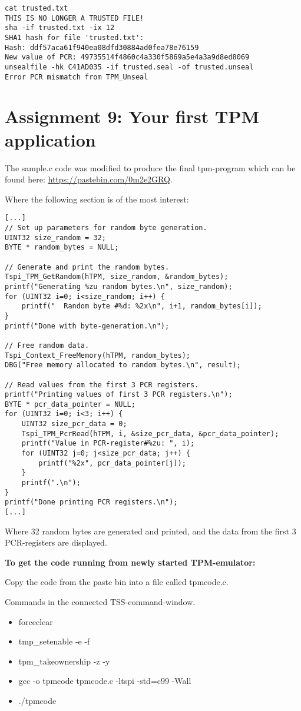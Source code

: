 \documentclass[10pt]{article}
\begin{document}
\begin{verbatim}
cat trusted.txt
THIS IS NO LONGER A TRUSTED FILE!
sha -if trusted.txt -ix 12
SHA1 hash for file 'trusted.txt':
Hash: ddf57aca61f940ea08dfd30884ad0fea78e76159
New value of PCR: 49735514f4860c4a330f5869a5e4a3a9d8ed8069
unsealfile -hk C41AD035 -if trusted.seal -of trusted.unseal
Error PCR mismatch from TPM_Unseal
\end{verbatim}

\section{Assignment 9: Your first TPM application}

The sample.c code was modified to produce the final tpm-program which can be
found here: \url{https://pastebin.com/0m2e2GRQ}.

Where the following section is of the most interest:

\begin{lstlisting}
[...]
// Set up parameters for random byte generation.
UINT32 size_random = 32;
BYTE * random_bytes = NULL;

// Generate and print the random bytes.
Tspi_TPM_GetRandom(hTPM, size_random, &random_bytes);
printf("Generating %zu random bytes.\n", size_random);
for (UINT32 i=0; i<size_random; i++) {
    printf("  Random byte #%d: %2x\n", i+1, random_bytes[i]);
}
printf("Done with byte-generation.\n");

// Free random data.
Tspi_Context_FreeMemory(hTPM, random_bytes);
DBG("Free memory allocated to random bytes.\n", result);

// Read values from the first 3 PCR registers.
printf("Printing values of first 3 PCR registers.\n");
BYTE * pcr_data_pointer = NULL;
for (UINT32 i=0; i<3; i++) {
    UINT32 size_pcr_data = 0;
    Tspi_TPM_PcrRead(hTPM, i, &size_pcr_data, &pcr_data_pointer);
    printf("Value in PCR-register#%zu: ", i);
    for (UINT32 j=0; j<size_pcr_data; j++) {
        printf("%2x", pcr_data_pointer[j]);
    }
    printf(".\n");
}
printf("Done printing PCR registers.\n");
[...]
\end{lstlisting}

Where 32 random bytes are generated and printed, and the data from the first 3 PCR-registers
are displayed.

\textbf{To get the code running from newly started TPM-emulator:}

Copy the code from the paste bin into a file called tpmcode.c.

Commands in the connected TSS-command-window.
\begin{itemize}
  \item{forceclear}
  \item{tmp\_setenable -e -f}
  \item{tpm\_takeownership -z -y}
  \item{gcc -o tpmcode tpmcode.c -ltspi -std=c99 -Wall}
  \item{./tpmcode}
\end{itemize}
\end{document}
